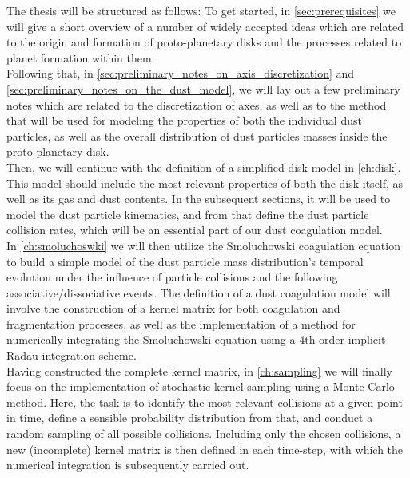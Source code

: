 The thesis will be structured as follows: To get started, in \cref{sec:prerequisites} we will 
give a short overview of a number of widely accepted ideas which are related to the origin and 
formation of proto-planetary disks and the processes related to planet formation within them. \\

Following that, in \cref{sec:preliminary_notes_on_axis_discretization} and 
\cref{sec:preliminary_notes_on_the_dust_model}, we will lay out a few preliminary notes
which are related to the discretization of axes, as well as to the method that will be used 
for modeling the properties of both the individual dust particles, as well as the overall
distribution of dust particles masses inside the proto-planetary disk. \\

Then, we will continue with the definition of a simplified disk model in \cref{ch:disk}. 
This model should include the most relevant properties of both the disk itself, as well as its 
gas and dust contents. In the subsequent sections, it will be used to model the dust particle 
kinematics, and from that define the dust particle collision rates, which will be an essential 
part of our dust coagulation model. \\

In \cref{ch:smoluchoswki} we will then utilize the Smoluchowski coagulation equation to build a 
simple model of the dust particle mass distribution's temporal evolution under 
the influence of particle collisions and the following associative/dissociative events. 
The definition of a dust coagulation model will involve 
the construction of a kernel matrix for both coagulation and fragmentation processes,
as well as the implementation of a method for numerically integrating the Smoluchowski 
equation using a 4th order implicit Radau integration scheme. \\

Having constructed the complete kernel matrix, in \cref{ch:sampling} we will finally focus on 
the implementation of stochastic kernel sampling using a Monte Carlo method. 
Here, the task is to identify the most relevant collisions at a given point in time,
define a sensible probability distribution from that, and conduct a random sampling of all possible 
collisions. Including only the chosen collisions, a new (incomplete) kernel matrix is then 
defined in each time-step, with which the numerical integration is subsequently carried out.


